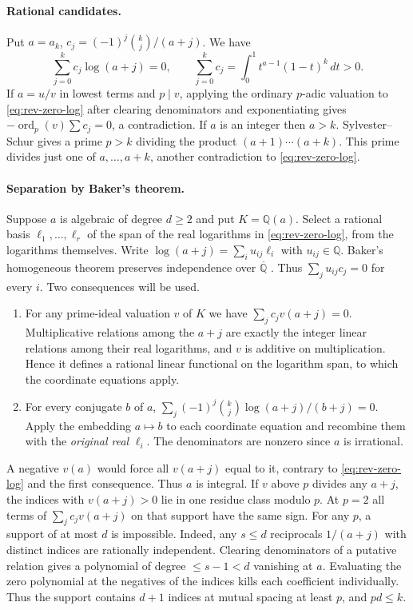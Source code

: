 \documentclass[11pt,a4paper]{article}
\theoremstyle{definition}\newtheorem{definition}[theorem]{Definition}\newtheorem{example}[theorem]{Example}
\theoremstyle{remark}\newtheorem{remark}[theorem]{Remark}
\newcommand{\Q}{\mathbb Q}\newcommand{\Z}{\mathbb Z}\newcommand{\R}{\mathbb R}\newcommand{\N}{\mathbb N}
\begin{document}
\paragraph{Rational candidates.}
Put $a=a_k$, $c_j=(-1)^j\binom{k}{j}/(a+j)$. We have
\begin{equation}\label{eq:rev-zero-log}
 \sum_{j=0}^k c_j\log(a+j)=0,\qquad
 \sum_{j=0}^k c_j=\int_0^1 t^{a-1}(1-t)^k\,dt>0.
\end{equation}
If $a=u/v$ in lowest terms and $p\mid v$, applying the ordinary $p$-adic valuation to \eqref{eq:rev-zero-log} after clearing denominators and exponentiating gives
$-\operatorname{ord}_p(v)\sum c_j=0$, a contradiction. If $a$ is an integer then $a>k$. Sylvester--Schur \cite{Erdos} gives a prime $p>k$ dividing the product $(a+1)\cdots(a+k)$. This prime divides just one of $a,\ldots,a+k$, another contradiction to \eqref{eq:rev-zero-log}.
\paragraph{Separation by Baker's theorem.}
Suppose $a$ is algebraic of degree $d\ge2$ and put $K=\Q(a)$. Select a rational basis $\ell_1,\ldots,\ell_r$ of the span of the real logarithms in \eqref{eq:rev-zero-log}, from the logarithms themselves. Write $\log(a+j)=\sum_i u_{ij}\ell_i$ with $u_{ij}\in\Q$. Baker's homogeneous theorem preserves independence over $\overline{\Q}$ \cite{Baker}. Thus $\sum_j u_{ij}c_j=0$ for every $i$. Two consequences will be used.
\begin{enumerate}
\item For any prime-ideal valuation $v$ of $K$ we have $\sum_j c_jv(a+j)=0$. Multiplicative relations among the $a+j$ are exactly the integer linear relations among their real logarithms, and $v$ is additive on multiplication. Hence it defines a rational linear functional on the logarithm span, to which the coordinate equations apply.
\item For every conjugate $b$ of $a$, $\sum_j(-1)^j\binom{k}{j}\log(a+j)/(b+j)=0$. Apply the embedding $a\mapsto b$ to each coordinate equation and recombine them with the \emph{original real} $\ell_i$. The denominators are nonzero since $a$ is irrational.
\end{enumerate}
A negative $v(a)$ would force all $v(a+j)$ equal to it, contrary to \eqref{eq:rev-zero-log} and the first consequence. Thus $a$ is integral. If $v$ above $p$ divides any $a+j$, the indices with $v(a+j)>0$ lie in one residue class modulo $p$. At $p=2$ all terms of $\sum_j c_jv(a+j)$ on that support have the same sign. For any $p$, a support of at most $d$ is impossible. Indeed, any $s\le d$ reciprocals $1/(a+j)$ with distinct indices are rationally independent. Clearing denominators of a putative relation gives a polynomial of degree $\le s-1<d$ vanishing at $a$. Evaluating the zero polynomial at the negatives of the indices kills each coefficient individually. Thus the support contains $d+1$ indices at mutual spacing at least $p$, and $pd\le k$.
\end{document}

